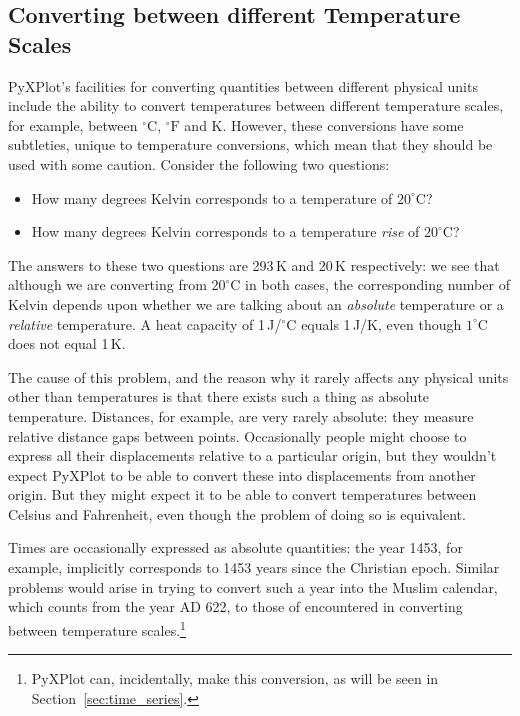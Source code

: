 \subsection{Converting between different Temperature Scales}

PyXPlot's facilities for converting quantities between different physical units
include the ability to convert temperatures between different temperature
scales, for example, between $^\circ\mathrm{C}$, $^\circ\mathrm{F}$ and K.
However, these conversions have some subtleties, unique to temperature
conversions, which mean that they should be used with some caution. Consider
the following two questions:
\begin{itemize}
\item How many degrees Kelvin corresponds to a temperature of $20^\circ$C?
\item How many degrees Kelvin corresponds to a temperature {\it rise} of $20^\circ$C?
\end{itemize}
The answers to these two questions are 293\,K and 20\,K respectively: we see
that although we are converting from $20^\circ$C in both cases, the
corresponding number of Kelvin depends upon whether we are talking about an
{\it absolute} temperature or a {\it relative} temperature. A heat capacity of
1\,J/$^\circ$C equals 1\,J/K, even though $1^\circ$C does not equal 1\,K.

The cause of this problem, and the reason why it rarely affects any physical
units other than temperatures is that there exists such a thing as absolute
temperature. Distances, for example, are very rarely absolute: they measure
relative distance gaps between points. Occasionally people might choose to
express all their displacements relative to a particular origin, but they
wouldn't expect PyXPlot to be able to convert these into displacements from
another origin. But they might expect it to be able to convert temperatures
between Celsius and Fahrenheit, even though the problem of doing so is
equivalent.

Times are occasionally expressed as absolute quantities: the year 1453, for
example, implicitly corresponds to 1453 years since the Christian epoch.
Similar problems would arise in trying to convert such a year into the Muslim
calendar, which counts from the year {\footnotesize AD} 622, to those of
encountered in converting between temperature scales.\footnote{PyXPlot can,
incidentally, make this conversion, as will be seen in
Section~\ref{sec:time_series}.}

